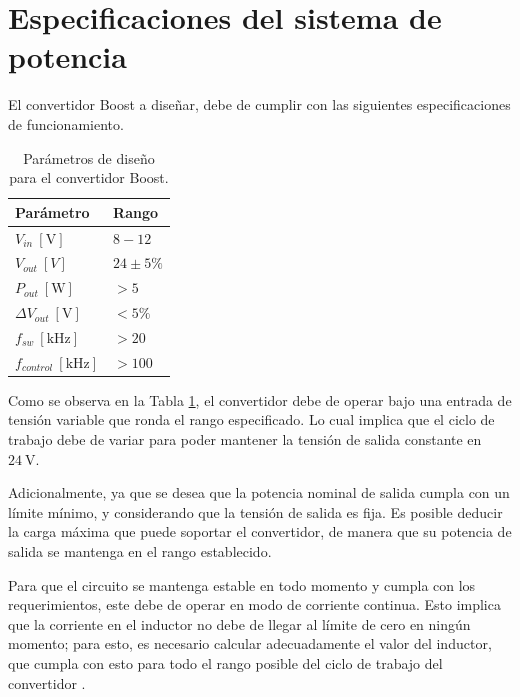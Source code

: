 \documentclass[conference]{IEEEtran}
\begin{document}
\section{Especificaciones del sistema de potencia}

El convertidor Boost a diseñar, debe de cumplir con las siguientes especificaciones
de funcionamiento.

\begin{table}[H]
    \centering
    \renewcommand{\arraystretch}{1.5}
    \begin{tabularx}{\columnwidth}{
        >{\hsize=1.5\hsize}X 
        >{\hsize=0.8\hsize}X
    }
        \toprule
        Parámetro                       & Rango  \\
        \midrule
        $V_{in}~[\mathrm{V}]$           & $8 - 12$  \\
        $V_{out}~[V]$                   & $24 \pm 5\%$   \\
        $P_{out}~\mathrm{[W]}$          & $> 5$    \\
        $\Delta V_{out}~[\mathrm{V}]$   & $< 5 \%$     \\
        $f_{sw}~\mathrm{[kHz]}$         & $> 20$  \\
        $f_{control}~\mathrm{[kHz]}$    & $> 100$   \\
        \bottomrule
    \end{tabularx}
    \vspace{4pt}
    \caption{Parámetros de diseño para el convertidor Boost.}
    \label{tab:parametros_Boost}
\end{table}

Como se observa en la Tabla \ref{tab:parametros_Boost}, el convertidor debe de operar
bajo una entrada de tensión variable que ronda el rango especificado. Lo cual implica que el ciclo
de trabajo debe de variar para poder mantener la tensión de salida constante en $24~\mathrm{V}$.

Adicionalmente, ya que se desea que la potencia nominal de salida cumpla con un límite mínimo, y considerando
que la tensión de salida es fija. Es posible deducir la carga máxima que puede soportar el convertidor, de manera
que su potencia de salida se mantenga en el rango establecido. 

Para que el circuito se mantenga estable en todo momento y cumpla con los requerimientos, este debe de operar
en modo de corriente continua. Esto implica que la corriente en el inductor no debe de llegar al límite 
de cero en ningún momento; para esto, es necesario calcular adecuadamente el valor del inductor, que cumpla con esto
para todo el rango posible del ciclo de trabajo del convertidor \cite{hart2011power}.
\end{document}
